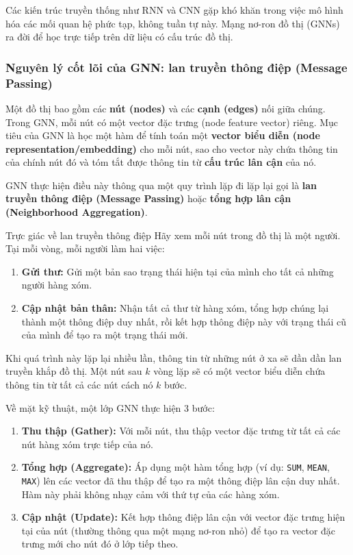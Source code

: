 Các kiến trúc truyền thống như RNN và CNN gặp khó khăn trong việc mô hình hóa các mối quan hệ phức tạp, không tuần tự này. Mạng nơ-ron đồ thị (GNNs) \cite{scarselli2009graph, kipf2016semi} ra đời để học trực tiếp trên dữ liệu có cấu trúc đồ thị.

\subsubsection{Nguyên lý cốt lõi của GNN: lan truyền thông điệp (Message Passing)}
\label{ssec:gnn_message_passing}

Một đồ thị bao gồm các \textbf{nút (nodes)} và các \textbf{cạnh (edges)} nối giữa chúng. Trong GNN, mỗi nút có một vector đặc trưng (node feature vector) riêng. Mục tiêu của GNN là học một hàm để tính toán một \textbf{vector biểu diễn (node representation/embedding)} cho mỗi nút, sao cho vector này chứa thông tin của chính nút đó và tóm tắt được thông tin từ \textbf{cấu trúc lân cận} của nó.

GNN thực hiện điều này thông qua một quy trình lặp đi lặp lại gọi là \textbf{lan truyền thông điệp (Message Passing)} hoặc \textbf{tổng hợp lân cận (Neighborhood Aggregation)}.

\begin{keyidea}{Trực giác về lan truyền thông điệp}
Hãy xem mỗi nút trong đồ thị là một người. Tại mỗi vòng, mỗi người làm hai việc:
\begin{enumerate}
    \item \textbf{Gửi thư:} Gửi một bản sao trạng thái hiện tại của mình cho tất cả những người hàng xóm.
    \item \textbf{Cập nhật bản thân:} Nhận tất cả thư từ hàng xóm, tổng hợp chúng lại thành một thông điệp duy nhất, rồi kết hợp thông điệp này với trạng thái cũ của mình để tạo ra một trạng thái mới.
\end{enumerate}
Khi quá trình này lặp lại nhiều lần, thông tin từ những nút ở xa sẽ dần dần lan truyền khắp đồ thị. Một nút sau $k$ vòng lặp sẽ có một vector biểu diễn chứa thông tin từ tất cả các nút cách nó $k$ bước.
\end{keyidea}

Về mặt kỹ thuật, một lớp GNN thực hiện 3 bước:
\begin{enumerate}
    \item \textbf{Thu thập (Gather):} Với mỗi nút, thu thập vector đặc trưng từ tất cả các nút hàng xóm trực tiếp của nó.
    \item \textbf{Tổng hợp (Aggregate):} Áp dụng một hàm tổng hợp (ví dụ: \texttt{SUM}, \texttt{MEAN}, \texttt{MAX}) lên các vector đã thu thập để tạo ra một thông điệp lân cận duy nhất. Hàm này phải không nhạy cảm với thứ tự của các hàng xóm.
    \item \textbf{Cập nhật (Update):} Kết hợp thông điệp lân cận với vector đặc trưng hiện tại của nút (thường thông qua một mạng nơ-ron nhỏ) để tạo ra vector đặc trưng mới cho nút đó ở lớp tiếp theo.
\end{enumerate}

